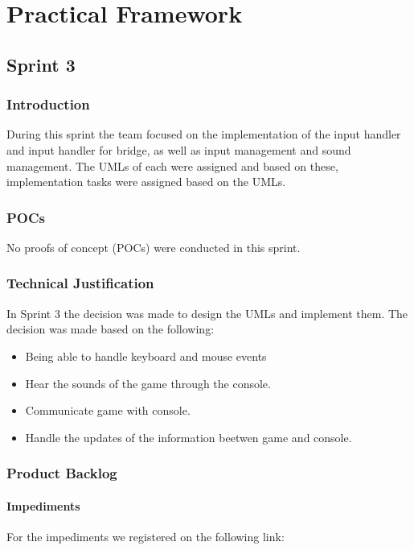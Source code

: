 
\section{Practical Framework}

\subsection{Sprint 3}

\subsubsection{Introduction}
During this sprint the team focused on the implementation of the input handler and input handler for bridge, as well as input management and sound management. The UMLs of each were assigned and based on these, implementation tasks were assigned based on the UMLs.

\subsubsection{POCs}

No proofs of concept (POCs) were conducted in this sprint.

\subsubsection{Technical Justification}
In Sprint 3 the decision was made to design the UMLs and implement them. The decision was made based on the following:

\begin{itemize}
    \item  Being able to handle keyboard and mouse events
    \item  Hear the sounds of the game through the console.
    \item  Communicate game with console.
    \item  Handle the updates of the information beetwen game and console.
\end{itemize}

\newpage

\subsubsection{Product Backlog}



\paragraph{Impediments}
For the impediments we registered on the following link:

